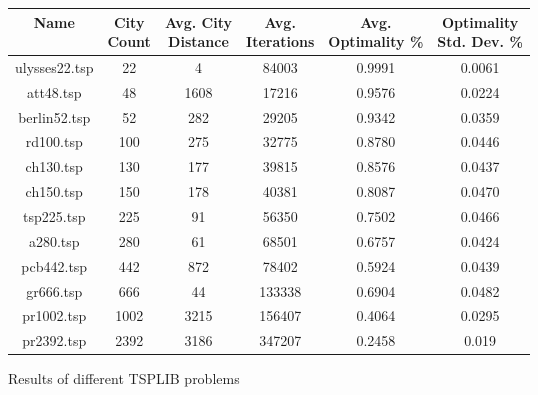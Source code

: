 \documentclass{article}
\begin{document}
\begin{figure}[h]
    \centering
    \begin{tabular}{ |c|c|c|c|c|c| } 
        \hline
        \thead{Name \\ } & \thead{City \\ Count} & \thead{Avg. City \\ Distance} & \thead{Avg. \\ Iterations} & \thead{Avg. \\ Optimality \%} & \thead{Optimality \\ Std. Dev. \%} \\
        \hline
        ulysses22.tsp & 22   & 4    & 84003  & 0.9991 & 0.0061 \\
        \hline
        att48.tsp     & 48   & 1608 & 17216  & 0.9576 & 0.0224 \\
        \hline
        berlin52.tsp  & 52   & 282  & 29205  & 0.9342 & 0.0359 \\ 
        \hline
        rd100.tsp     & 100  & 275  & 32775  & 0.8780 & 0.0446 \\
        \hline
        ch130.tsp     & 130  & 177  & 39815  & 0.8576 & 0.0437 \\
        \hline
        ch150.tsp     & 150  & 178  & 40381  & 0.8087 & 0.0470 \\
        \hline
        tsp225.tsp    & 225  & 91   & 56350  & 0.7502 & 0.0466 \\
        \hline
        a280.tsp      & 280  & 61   & 68501  & 0.6757 & 0.0424 \\
        \hline
        pcb442.tsp    & 442  & 872  & 78402  & 0.5924 & 0.0439 \\
        \hline
        gr666.tsp     & 666  & 44   & 133338 & 0.6904 & 0.0482 \\
        \hline
        pr1002.tsp    & 1002 & 3215 & 156407 & 0.4064 & 0.0295 \\
        \hline
        pr2392.tsp    & 2392 & 3186 & 347207 & 0.2458 & 0.019 \\
        \hline
    \end{tabular}
    \caption{Results of different TSPLIB problems}
\end{figure}
\end{document}
